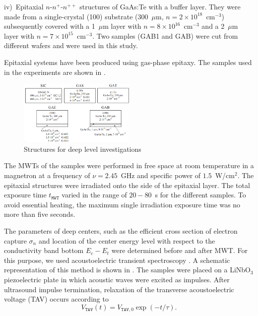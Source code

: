 \documentclass[10pt]{iopart}
\begin{document}
\noindent
iv)~Epitaxial $n$-$n^+$-$n^{++}$ structures of GaAs:Te with a buffer layer.
 They were made from a single-crystal (100) substrate (300~$\mu$m, $n= 2\times10^{18}$~cm$^{-3}$)
  subsequently covered with a 1~$\mu$m layer with $n=8\times10^{16}$~cm$^{-3}$ and
  a 2~$\mu$m layer with $n=7\times10^{15}$~cm$^{-3}$.
  Two samples (GAB1 and GAB) were cut from different wafers and were used in this study.

Epitaxial systems have been produced using gas-phase epitaxy.
The samples used in the experiments are shown in .

\begin{figure}
\includegraphics[width=0.5\textwidth]{Fig1}
\caption{\label{figSamp_TAV}
Structures for deep level investigations
}%
\end{figure}

The MWTs of the samples were performed in free space at room temperature in a magnetron at a frequency of  $\nu=2.45$~GHz
and specific power of $1.5$~W/cm$^{2}$.
The epitaxial structures were irradiated onto the side of the epitaxial layer.
The total exposure time $t_\mathtt{MWT}$ varied in the range of $20-80$~s for the different samples.
To avoid essential heating, the maximum single irradiation exposure time was no more than  five seconds.


The parameters of deep centers, such as the efficient cross section of electron capture $\sigma_n$
and location of the center energy level with respect to the conductivity band bottom $E_c-E_t$ were determined before and after MWT.
For this purpose, we used acoustoelectric transient spectroscopy \cite{OstrovPAN,OlikhSSC,PANnewEn,OstrovskiiSST}.
A schematic representation of this method is shown in .
The samples were placed on a LiNbO$_3$ piezoelectric plate in which acoustic waves were excited as impulses.
After ultrasound impulse termination, relaxation of the transverse  acoustoelectric voltage (TAV) occurs according to
\begin{equation}\label{eqVtav}
  V_\mathtt{TAV}(t)=V_{\mathtt{TAV},0}\exp(-t/\tau).
\end{equation}
\end{document}
